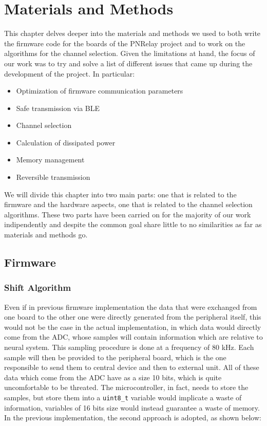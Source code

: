 \documentclass{Configuration_Files/PoliMi3i_thesis}
\begin{document}
\chapter{Materials and Methods}
This chapter delves deeper into the materials and methods we used to both write the firmware code for the boards of the PNRelay project and to work on the algorithms for the channel selection.
Given the limitations at hand, the focus of our work was to try and solve a list of different issues that came up during the development of the project.
In particular:

\begin{itemize}
	\item Optimization of firmware communication parameters
	\item Safe transmission via BLE
	\item Channel selection
	\item Calculation of dissipated power
	\item Memory management
	\item Reversible transmission
\end{itemize}

We will divide this chapter into two main parts: one that is related to the firmware and the hardware aspects, one that is related to the channel selection algorithms.
These two parts have been carried on for the majority of our work indipendently and despite the common goal share little to no similarities as far as materials and methods go.

\section{Firmware}

\subsection{Shift Algorithm}

Even if in previous firmware implementation the data that were exchanged from one board to the other one were directly generated from the peripheral itself, this would not be the case in the actual implementation, in which data would directly come from the ADC, whose samples will contain information which are relative to neural system. This sampling procedure is done at a frequency of 80 kHz. Each sample will then be provided to the peripheral board, which is the one responsible to send them to central device and then to external unit. All of these data which come from the ADC have as a size 10 bits, which is quite uncomfortable to be threated. The microcontroller, in fact, needs to store the samples, but store them into a \texttt{uint8\_t} variable would implicate a waste of information, variables of 16 bits size would instead guarantee a waste of memory. In the previous implementation, the second approach is adopted, as shown below:
\end{document}
